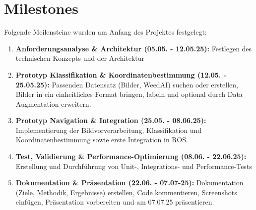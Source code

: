 \documentclass[12pt, a4paper]{scrreprt}
\begin{document}
\section{Milestones}
Folgende Meilensteine wurden am Anfang des Projektes festgelegt:
\begin{enumerate}
    \item \textbf{Anforderungsanalyse \& Architektur (05.05. - 12.05.25):} Festlegen des technischen Konzepts und der Architektur
    \item \textbf{Prototyp Klassifikation \& Koordinatenbestimmung (12.05. - 25.05.25):} Passenden Datensatz (Bilder, WeedAI) suchen oder erstellen, Bilder in ein einheitliches Format bringen, labeln und optional durch Data Augmentation erweitern.
    \item \textbf{Prototyp Navigation \& Integration (25.05. - 08.06.25):} Implementierung der Bildvorverarbeitung, Klassifikation und Koordinatenbestimmung sowie erste Integration in ROS.
    \item \textbf{Test, Validierung \& Performance-Optimierung (08.06. - 22.06.25):} Erstellung und Durchführung von Unit-, Integrations- und Performance-Tests
    \item \textbf{Dokumentation \& Präsentation (22.06. - 07.07-25):} Dokumentation (Ziele, Methodik, Ergebnisse) erstellen, Code kommentieren, Screenshots einfügen, Präsentation vorbereiten und am 07.07.25 präsentieren.
\end{enumerate}
\end{document}
